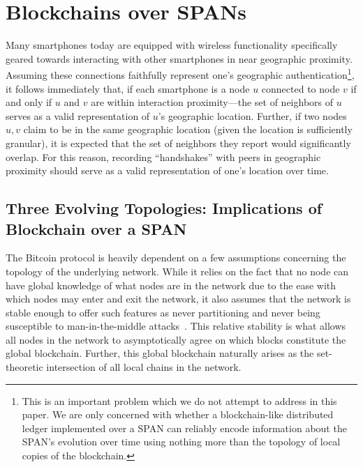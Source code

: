 \section{Blockchains over SPANs}
\label{sec:motivation}

Many smartphones today are equipped with wireless functionality specifically
geared towards interacting with other smartphones in near geographic proximity.
Assuming these connections faithfully represent one's geographic
authentication\footnote{This is an important problem which we do not attempt to
address in this paper. We are only concerned with whether a blockchain-like distributed
ledger implemented over a SPAN can reliably encode information about the SPAN's evolution
over time using nothing more than the topology of local copies of the blockchain.},
it follows immediately that, if each smartphone is a node $u$ connected to node $v$ if and only
if $u$ and $v$ are within interaction proximity---the set of neighbors of $u$ serves as
a valid representation of $u$'s geographic location. Further, if two nodes $u,v$ claim to be
in the same geographic location (given the location is sufficiently granular), it is expected
that the set of neighbors they report would significantly overlap. For this reason,
recording ``handshakes'' with peers in geographic proximity should serve as a valid
representation of one's location over time.

\subsection{Three Evolving Topologies: Implications of Blockchain over a SPAN}

The Bitcoin protocol is heavily dependent on a few assumptions concerning
the topology of the underlying network. While it relies on the fact that no
node can have global knowledge of what nodes are in the network due to the
ease with which nodes may enter and exit the network, it also assumes that the
network is stable enough to offer such features as never partitioning and never
being susceptible to man-in-the-middle attacks~\cite{nakamoto2008bitcoin}. This
relative stability is what allows all nodes in the network to asymptotically
agree on which blocks constitute the global blockchain. Further, this global
blockchain naturally arises as the set-theoretic intersection of all local 
chains in the network.

